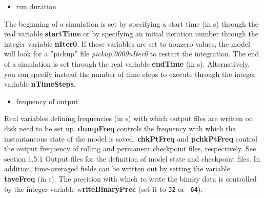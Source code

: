 \begin{itemize}
\item run duration
\end{itemize}

The beginning of a simulation is set by specifying a start time (in s)
through the real variable \textbf{startTime }or by specifying an initial
iteration number through the integer variable \textbf{nIter0}. If these
variables are set to nonzero values, the model will look for a ''pickup''
file \textit{pickup.0000nIter0 }to restart the integration\textit{. }The end
of a simulation is set through the real variable \textbf{endTime }(in s).
Alternatively, you can specify instead the number of time steps to execute
through the integer variable \textbf{nTimeSteps}. 

\begin{itemize}
\item frequency of output
\end{itemize}

Real variables defining frequencies (in s) with which output files are
written on disk need to be set up. \textbf{dumpFreq }controls the frequency
with which the instantaneous state of the model is saved. \textbf{chkPtFreq }%
and \textbf{pchkPtFreq }control the output frequency of rolling and
permanent checkpoint files, respectively. See section 1.5.1 Output files for the
definition of model state and checkpoint files. In addition, time-averaged
fields can be written out by setting the variable \textbf{taveFreq} (in s).
The precision with which to write the binary data is controlled by the
integer variable w\textbf{riteBinaryPrec }(set it to \texttt{32} or \texttt{%
64}).
